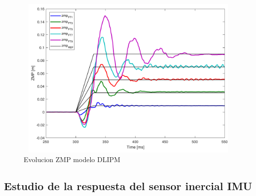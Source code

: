 






\begin{figure}[H]
\centering
\includegraphics[width=13cm, height=8cm]{imagenes/apartado_5/5.1/figura4.pdf}
\caption{Evolucion ZMP modelo DLIPM}
\label{figura55}
\end{figure}

\subsection{Estudio de la respuesta del sensor inercial IMU}\label{respuestaIMU}



\afterpage{\null\newpage}
\newpage
